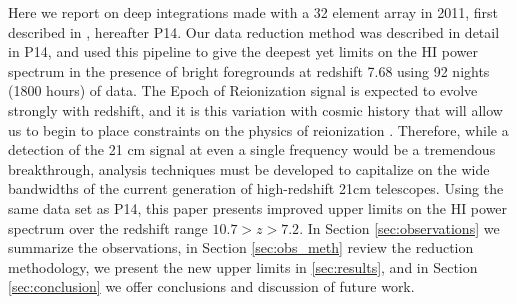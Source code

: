 \documentclass[preprint]{aastex}
\begin{document}
Here we report on deep integrations made with a 32 element array in 2011, first described in \cite{Parsons:2014p10499}, hereafter P14.  Our data reduction method was described in detail in P14, and used this pipeline to give the deepest yet limits on the HI power spectrum in the presence of bright foregrounds at redshift 7.68 using 92 nights (1800 hours) of data.  The Epoch of Reionization signal is expected to evolve strongly with redshift, and it is this variation with cosmic history that will allow us to begin to place constraints on the physics of reionization \citep{Pritchard:2008p8123,Pober:2014p10390}.  Therefore, while a detection of the 21 cm signal at even a single frequency would be a tremendous breakthrough, analysis techniques must be developed to capitalize on the wide bandwidths of the current generation of high-redshift 21cm telescopes.  Using the same data set as P14, this paper presents improved upper limits on the HI power spectrum over the redshift range $10.7>z>7.2$.  In Section  \ref{sec:observations} we summarize the observations, in Section \ref{sec:obs_meth} review the reduction methodology, we present the new upper limits in \ref{sec:results}, and in Section \ref{sec:conclusion} we offer conclusions and discussion of future work.



%


\end{document}
